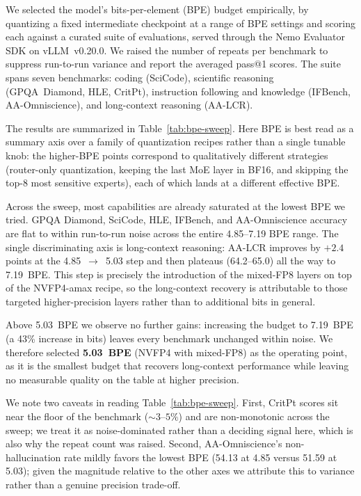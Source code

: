 We selected the model's bits-per-element (BPE) budget empirically, by quantizing a
fixed intermediate checkpoint at a range of BPE settings and scoring each against a
curated suite of evaluations, served through the Nemo Evaluator SDK on vLLM~v0.20.0.
We raised the number of repeats per benchmark to suppress run-to-run variance and
report the averaged pass@1 scores. The suite spans seven benchmarks: coding (SciCode),
scientific reasoning (GPQA~Diamond, HLE, CritPt), instruction following and knowledge
(IFBench, AA-Omniscience), and long-context reasoning (AA-LCR).

The results are summarized in Table~\ref{tab:bpe-sweep}.
Here BPE is best read as a
summary axis over a family of quantization recipes rather than a single tunable knob:
the higher-BPE points correspond to qualitatively different strategies (router-only
quantization, keeping the last MoE layer in BF16, and skipping the top-8 most
sensitive experts), each of which lands at a different effective BPE.

Across the sweep, most capabilities are already saturated at the lowest BPE we tried.
GPQA Diamond, SciCode, HLE,
IFBench, and AA-Omniscience accuracy are flat to within
run-to-run noise across the entire 4.85--7.19 BPE range. The single discriminating
axis is long-context reasoning: AA-LCR improves by $+2.4$ points
at the 4.85~$\rightarrow$~5.03 step and then plateaus (64.2--65.0) all the way
to 7.19~BPE. This step is precisely the introduction of the mixed-FP8 layers on top of
the NVFP4-amax recipe, so the long-context recovery is attributable to those targeted
higher-precision layers rather than to additional bits in general.

Above 5.03~BPE we observe no further gains: increasing the budget to 7.19~BPE
(a 43\% increase in bits) leaves every benchmark unchanged within noise. We therefore
selected \textbf{5.03~BPE} (NVFP4 with mixed-FP8) as the operating point, as it is the
smallest budget that recovers long-context performance while leaving no measurable
quality on the table at higher precision.

We note two caveats in reading Table~\ref{tab:bpe-sweep}. First, CritPt scores sit near
the floor of the benchmark (${\sim}3$--$5\%$) and are non-monotonic across the sweep; we
treat it as noise-dominated rather than a deciding signal here, which is also why the
repeat count was raised. Second, AA-Omniscience's non-hallucination rate mildly favors
the lowest BPE (54.13 at 4.85 versus 51.59 at 5.03); given the magnitude relative to the
other axes we attribute this to variance rather than a genuine precision trade-off.
\label{app:bpe-sweep}

